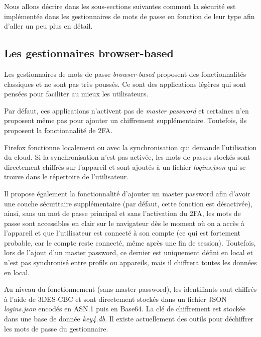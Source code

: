 Nous allons décrire dans les sous-sections suivantes comment la sécurité est implémentée dans les gestionnaires de mots de passe en fonction de leur type afin d'aller un peu plus en détail. 

\subsection{Les gestionnaires browser-based}
Les gestionnaires de mots de passe \textit{browser-based} proposent des fonctionnalités classiques et ne sont pas très poussés. Ce sont des applications légères qui sont pensées pour faciliter au mieux les utilisateurs.\cite{Browser}

Par défaut, ces applications n'activent pas de \textit{master password} et certaines n'en proposent même pas pour ajouter un chiffrement supplémentaire. Toutefois, ils proposent la fonctionnalité de 2FA.

Firefox fonctionne localement ou avec la synchronisation qui demande l'utilisation du cloud. Si la synchronisation n'est pas activée, les mots de passes stockés sont directement chiffrés sur l'appareil et sont ajoutés à un fichier \textit{logins.json} qui se trouve dans le répertoire de l'utilisateur. 

Il propose également la fonctionnalité d'ajouter un master password afin d'avoir une couche sécuritaire supplémentaire (par défaut, cette fonction est désactivée), ainsi, sans un mot de passe principal et sans l'activation du 2FA, les mots de passe sont accessibles en clair sur le navigateur dès le moment où on a accès à l'appareil et que l'utilisateur est connecté à son compte (ce qui est fortement probable, car le compte reste connecté, même après une fin de session). Toutefois, lors de l'ajout d'un master password, ce dernier est uniquement défini en local et n'est pas synchronisé entre profils ou appareils, mais il chiffrera toutes les données en local. 

Au niveau du fonctionnement\cite{firefoxEncr} (sans master password), les identifiants sont chiffrés à l'aide de 3DES-CBC et sont directement stockés dans un fichier JSON \textit{logins.json} encodés en ASN.1 puis en Base64. La clé de chiffrement est stockée dans une base de donnée \textit{key4.db}. Il existe actuellement des outils pour déchiffrer les mots de passe du gestionnaire.

